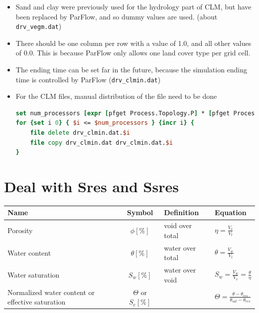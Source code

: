 \documentclass[11pt,a4paper]{report}
\begin{document}
\begin{itemize}
\item Sand and clay were previously used for the hydrology part of CLM, but have been replaced by ParFlow, and so dummy values are used. (about \verb$drv_vegm.dat$)

\item There should be one column per row with a value of 1.0, and all other values of 0.0. This is because ParFlow only allows one land cover type per grid cell.

\item The ending time can be set far in the future, because the simulation ending time is controlled by ParFlow (\verb$drv_clmin.dat$)

\item For the CLM files, manual distribution of the file need to be done
\begin{lstlisting}[language=TCL]
set num_processors [expr [pfget Process.Topology.P] * [pfget Process.Topology.Q] * [pfget Process.Topology.R]] 
for {set i 0} { $i <= $num_processors } {incr i} { 
	file delete drv_clmin.dat.$i 
	file copy drv_clmin.dat drv_clmin.dat.$i 
}
\end{lstlisting}
\end{itemize}









\section{Deal with Sres and Ssres}
\label{sec:degreeofsat}

\begin{table}[htbp]
\centering
\begin{tabular}{p{4.5cm}cll}
\toprule
Name 		& Symbol 		& Definition 			& Equation \\
\midrule
Porosity		& $\phi [\%]$	& void over total		& $ \eta=\frac{V_v}{V_t} $ \\
Water content		& $\theta [\%]$	& water over total		& $\theta=\frac{V_w}{V_t}$ \\
Water saturation		& $S_w [\%]$	& water over void		& $S_w=\frac{V_w}{V_v}=\frac{\theta}{\eta}$ \\
Normalized water content	 or effective saturation 	& $\Theta$ or $S_e [\%]$	&  & $\Theta=\frac{\theta -\theta_{res}}{\theta_{sat} -\theta_{res}}$ \\
\bottomrule
\end{tabular}
\end{table}
\end{document}
